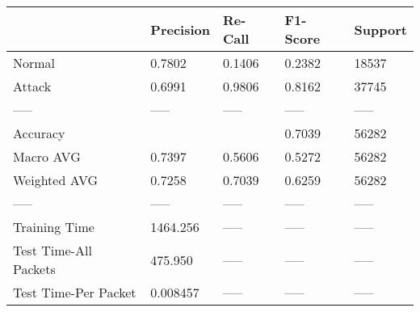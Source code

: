 \begin{tabular}{lllll}
\toprule
{} & Precision & Re-Call & F1-Score & Support \\
\midrule
Normal                &    0.7802 &  0.1406 &   0.2382 &   18537 \\
Attack                &    0.6991 &  0.9806 &   0.8162 &   37745 \\
-----                 &     ----- &   ----- &    ----- &   ----- \\
Accuracy              &           &         &   0.7039 &   56282 \\
Macro AVG             &    0.7397 &  0.5606 &   0.5272 &   56282 \\
Weighted AVG          &    0.7258 &  0.7039 &   0.6259 &   56282 \\
-----                 &     ----- &   ----- &    ----- &   ----- \\
Training Time         &  1464.256 &   ----- &    ----- &   ----- \\
Test Time-All Packets &   475.950 &   ----- &    ----- &   ----- \\
Test Time-Per Packet  &  0.008457 &   ----- &    ----- &   ----- \\
\bottomrule
\end{tabular}
